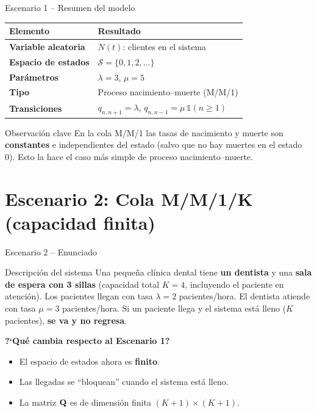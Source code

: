 \documentclass[aspectratio=1610, 9pt]{beamer}
\begin{document}
\begin{frame}{Escenario 1 -- Resumen del modelo}
\begin{center}
\renewcommand{\arraystretch}{1.3}
\begin{tabular}{>{\bfseries}l l}
\toprule
Elemento & Resultado \\
\midrule
Variable aleatoria & $N(t)$: clientes en el sistema \\
Espacio de estados & $\mathcal{S} = \{0,1,2,\ldots\}$ \\
Par\'ametros & $\lambda=3$, $\mu=5$ \\
Tipo & Proceso nacimiento--muerte (M/M/1) \\
Transiciones & $q_{n,n+1}=\lambda$, \; $q_{n,n-1}=\mu\,\mathbb{1}(n\ge1)$ \\
\bottomrule
\end{tabular}
\end{center}

\vspace{8pt}
\begin{block}{Observación clave}
En la cola M/M/1 las tasas de nacimiento y muerte son \textbf{constantes} e independientes del estado (salvo que no hay muertes en el estado 0). Esto la hace el caso m\'as simple de proceso nacimiento--muerte.
\end{block}
\end{frame}

\section{Escenario 2: Cola M/M/1/K (capacidad finita)}

\begin{frame}{Escenario 2 -- Enunciado}
\begin{exampleblock}{Descripción del sistema}
Una peque\~na cl\'inica dental tiene \textbf{un dentista} y una \textbf{sala de espera con 3 sillas} (capacidad total $K=4$, incluyendo el paciente en atenci\'on). Los pacientes llegan con tasa $\lambda = 2$ pacientes/hora. El dentista atiende con tasa $\mu = 3$ pacientes/hora. Si un paciente llega y el sistema est\'a lleno ($K$ pacientes), \textbf{se va y no regresa}.
\end{exampleblock}

\vspace{6pt}
\textbf{?`Qu\'e cambia respecto al Escenario 1?}
\begin{itemize}
    \item El espacio de estados ahora es \textbf{finito}.
    \item Las llegadas se ``bloquean'' cuando el sistema est\'a lleno.
    \item La matriz $\mathbf{Q}$ es de dimensi\'on finita $(K+1)\times(K+1)$.
\end{itemize}
\end{frame}
\end{document}
